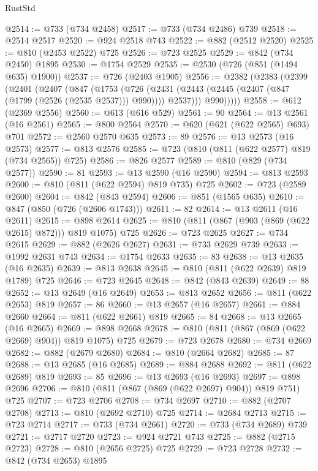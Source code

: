 \begin{lexlean}{RustStd}
\begin{coremodule}
@2514 := @733 (@734 @2458)
@2517 := @733 (@734 @2486) @739
@2518 := @2514 @2517
@2520 := @924 @2518 @743
@2522 := @882 (@2512 @2520)
@2525 := @810 (@2453 @2522) @725
@2526 := @723 @2525
@2529 := @842 (@734 @2450) @1895
@2530 := @1754 @2529
@2535 := @2530 (@726 (@851 (@1494 @635) @1900))
@2537 := @726 (@2403 @1905)
@2556 := @2382
    (@2383
      (@2399
        (@2401
          (@2407
            (@847
              (@1753
                (@726
                  (@2431 (@2443 (@2445 (@2407 (@847 (@1799 (@2526 (@2535 @2537))) @990)))) @2537)))
              @990)))))
@2558 := @612 (@2369 @2556)
@2560 := @613 (@616 @529)
@2561 := 90
@2564 := @13 @2561 (@16 @2561)
@2565 := @800 @2564
@2570 := @620 (@621 (@622 @2565) @693) @701
@2572 := @2560 @2570 @635
@2573 := 89
@2576 := @13 @2573 (@16 @2573)
@2577 := @813 @2576
@2585 := @723 (@810 (@811 (@622 @2577) @819 (@734 @2565)) @725)
@2586 := @826 @2577
@2589 := @810 (@829 (@734 @2577))
@2590 := 81
@2593 := @13 @2590 (@16 @2590)
@2594 := @813 @2593
@2600 := @810 (@811 (@622 @2594) @819 @735) @725
@2602 := @723 (@2589 @2600)
@2604 := @842 (@843 @2594)
@2606 := @851 (@1565 @635)
@2610 := @847 (@850 (@726 (@2606 @1743)))
@2611 := 82
@2614 := @13 @2611 (@16 @2611)
@2615 := @898 @2614
@2625 := @810 (@811 (@867 (@903 (@869 (@622 @2615) @872))) @819 @1075) @725
@2626 := @723 @2625
@2627 := @734 @2615
@2629 := @882 (@2626 @2627)
@2631 := @733 @2629 @739
@2633 := @1992 @2631 @743
@2634 := @1754 @2633
@2635 := 83
@2638 := @13 @2635 (@16 @2635)
@2639 := @813 @2638
@2645 := @810 (@811 (@622 @2639) @819 @1789) @725
@2646 := @723 @2645
@2648 := @842 (@843 @2639)
@2649 := 88
@2652 := @13 @2649 (@16 @2649)
@2653 := @813 @2652
@2656 := @811 (@622 @2653) @819
@2657 := 86
@2660 := @13 @2657 (@16 @2657)
@2661 := @884 @2660
@2664 := @811 (@622 @2661) @819
@2665 := 84
@2668 := @13 @2665 (@16 @2665)
@2669 := @898 @2668
@2678 := @810 (@811 (@867 (@869 (@622 @2669) @904)) @819 @1075) @725
@2679 := @723 @2678
@2680 := @734 @2669
@2682 := @882 (@2679 @2680)
@2684 := @810 (@2664 @2682)
@2685 := 87
@2688 := @13 @2685 (@16 @2685)
@2689 := @884 @2688
@2692 := @811 (@622 @2689) @819
@2693 := 85
@2696 := @13 @2693 (@16 @2693)
@2697 := @898 @2696
@2706 := @810 (@811 (@867 (@869 (@622 @2697) @904)) @819 @751) @725
@2707 := @723 @2706
@2708 := @734 @2697
@2710 := @882 (@2707 @2708)
@2713 := @810 (@2692 @2710) @725
@2714 := @2684 @2713
@2715 := @723 @2714
@2717 := @733 (@734 @2661)
@2720 := @733 (@734 @2689) @739
@2721 := @2717 @2720
@2723 := @924 @2721 @743
@2725 := @882 (@2715 @2723)
@2728 := @810 (@2656 @2725) @725
@2729 := @723 @2728
@2732 := @842 (@734 @2653) @1895

\end{coremodule}
\end{lexlean}
